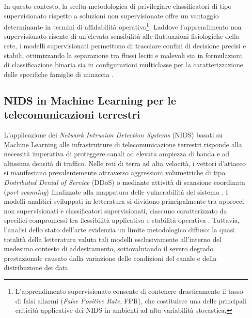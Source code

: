 In questo contesto, la scelta metodologica di privilegiare classificatori di tipo supervisionato rispetto a soluzioni non supervisionate offre un vantaggio determinante in termini di affidabilità operativa\footnote{L'apprendimento supervisionato consente di contenere drasticamente il tasso di falsi allarmi (\textit{False Positive Rate}, FPR), che costituisce una delle principali criticità applicative dei NIDS in ambienti ad alta variabilità stocastica.}.
Laddove l'apprendimento non supervisionato risente di un'elevata sensibilità alle fluttuazioni fisiologiche della rete, i modelli supervisionati permettono di tracciare confini di decisione precisi e stabili, ottimizzando la separazione tra flussi leciti e malevoli sia in formulazioni di classificazione binaria sia in configurazioni multiclasse per la caratterizzazione delle specifiche famiglie di minaccia \cite{kilincer2021}.

\subsection{NIDS in Machine Learning per le telecomunicazioni terrestri}
\label{subsec:ids_terrestri}

L'applicazione dei \textit{Network Intrusion Detection Systems} (NIDS) basati su Machine Learning alle infrastrutture di telecomunicazione terrestri risponde alla necessità imperativa di proteggere canali ad elevata ampiezza di banda e ad altissima densità di traffico.
Nelle reti di terra ad alta velocità, i vettori d'attacco si manifestano prevalentemente attraverso aggressioni volumetriche di tipo \textit{Distributed Denial of Service} (DDoS) o mediante attività di scansione coordinata (\textit{port scanning}) finalizzate alla mappatura delle vulnerabilità del sistema \cite{hindy2020, khraisat2019}.
I modelli analitici sviluppati in letteratura si dividono principalmente tra approcci non supervisionati e classificatori supervisionati, ciascuno caratterizzato da specifici compromessi tra flessibilità applicativa e stabilità operativa \cite{kilincer2021}.
Tuttavia, l'analisi dello stato dell'arte evidenzia un limite metodologico diffuso: la quasi totalità della letteratura valuta tali modelli esclusivamente all'interno del medesimo contesto di addestramento, sottovalutando il severo degrado prestazionale causato dalla variazione delle condizioni del canale e della distribuzione dei dati.

